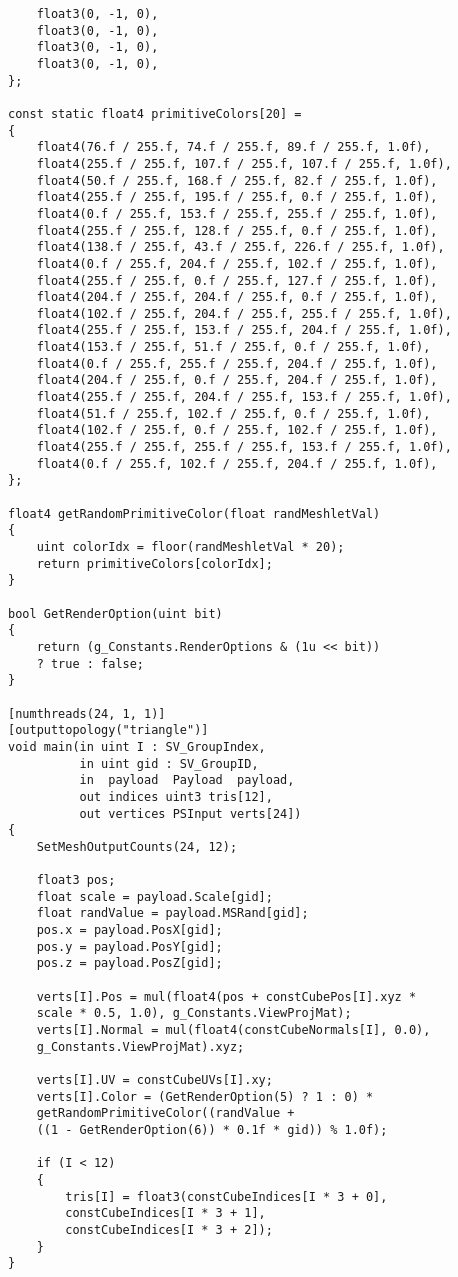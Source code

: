 \begin{lstlisting}
    float3(0, -1, 0),
    float3(0, -1, 0),
    float3(0, -1, 0),
    float3(0, -1, 0),
};

const static float4 primitiveColors[20] =
{
    float4(76.f / 255.f, 74.f / 255.f, 89.f / 255.f, 1.0f),
    float4(255.f / 255.f, 107.f / 255.f, 107.f / 255.f, 1.0f),
    float4(50.f / 255.f, 168.f / 255.f, 82.f / 255.f, 1.0f),
    float4(255.f / 255.f, 195.f / 255.f, 0.f / 255.f, 1.0f),
    float4(0.f / 255.f, 153.f / 255.f, 255.f / 255.f, 1.0f),
    float4(255.f / 255.f, 128.f / 255.f, 0.f / 255.f, 1.0f),
    float4(138.f / 255.f, 43.f / 255.f, 226.f / 255.f, 1.0f),
    float4(0.f / 255.f, 204.f / 255.f, 102.f / 255.f, 1.0f),
    float4(255.f / 255.f, 0.f / 255.f, 127.f / 255.f, 1.0f),
    float4(204.f / 255.f, 204.f / 255.f, 0.f / 255.f, 1.0f),
    float4(102.f / 255.f, 204.f / 255.f, 255.f / 255.f, 1.0f),
    float4(255.f / 255.f, 153.f / 255.f, 204.f / 255.f, 1.0f),
    float4(153.f / 255.f, 51.f / 255.f, 0.f / 255.f, 1.0f),
    float4(0.f / 255.f, 255.f / 255.f, 204.f / 255.f, 1.0f),
    float4(204.f / 255.f, 0.f / 255.f, 204.f / 255.f, 1.0f),
    float4(255.f / 255.f, 204.f / 255.f, 153.f / 255.f, 1.0f),
    float4(51.f / 255.f, 102.f / 255.f, 0.f / 255.f, 1.0f),
    float4(102.f / 255.f, 0.f / 255.f, 102.f / 255.f, 1.0f),
    float4(255.f / 255.f, 255.f / 255.f, 153.f / 255.f, 1.0f),
    float4(0.f / 255.f, 102.f / 255.f, 204.f / 255.f, 1.0f),
};

float4 getRandomPrimitiveColor(float randMeshletVal)
{    
    uint colorIdx = floor(randMeshletVal * 20);
    return primitiveColors[colorIdx];
}

bool GetRenderOption(uint bit)
{
    return (g_Constants.RenderOptions & (1u << bit)) 
    ? true : false;
}

[numthreads(24, 1, 1)]
[outputtopology("triangle")]
void main(in uint I : SV_GroupIndex,
          in uint gid : SV_GroupID,
          in  payload  Payload  payload,
          out indices uint3 tris[12],
          out vertices PSInput verts[24])
{        
    SetMeshOutputCounts(24, 12);
    
    float3 pos;
    float scale = payload.Scale[gid];
    float randValue = payload.MSRand[gid];
    pos.x = payload.PosX[gid];
    pos.y = payload.PosY[gid];
    pos.z = payload.PosZ[gid];
    
    verts[I].Pos = mul(float4(pos + constCubePos[I].xyz * 
    scale * 0.5, 1.0), g_Constants.ViewProjMat);
    verts[I].Normal = mul(float4(constCubeNormals[I], 0.0), 
    g_Constants.ViewProjMat).xyz;
    
    verts[I].UV = constCubeUVs[I].xy;
    verts[I].Color = (GetRenderOption(5) ? 1 : 0) * 
    getRandomPrimitiveColor((randValue + 
    ((1 - GetRenderOption(6)) * 0.1f * gid)) % 1.0f);
    
    if (I < 12)
    {
        tris[I] = float3(constCubeIndices[I * 3 + 0], 
        constCubeIndices[I * 3 + 1], 
        constCubeIndices[I * 3 + 2]);
    }
}
\end{lstlisting}

